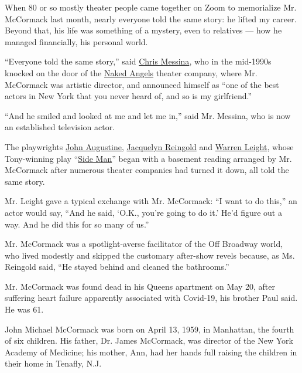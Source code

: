 When 80 or so mostly theater people came together on Zoom to memorialize
Mr. McCormack last month, nearly everyone told the same story: he lifted
my career. Beyond that, his life was something of a mystery, even to
relatives --- how he managed financially, his personal world.

``Everyone told the same story,'' said
\href{https://www.thecut.com/2020/02/why-chris-messina-should-be-on-the-chris-list.html}{Chris
Messina}, who in the mid-1990s knocked on the door of the
\href{https://www.nakedangels.com/}{Naked Angels} theater company, where
Mr. McCormack was artistic director, and announced himself as ``one of
the best actors in New York that you never heard of, and so is my
girlfriend.''

``And he smiled and looked at me and let me in,'' said Mr. Messina, who
is now an established television actor.

The playwrights
\href{https://www.broadwayworld.com/bwwbooks/article/Christopher-Durang-and-John-Augustine-Announced-as-Playwrights-in-Residence-at-Texas-State-20130904}{John
Augustine}, \href{https://www.jacquelynreingold.com/}{Jacquelyn
Reingold} and
\href{https://lawandorder.fandom.com/wiki/Warren_Leight}{Warren Leight},
whose Tony-winning play
``\href{https://www.nytimes.com/1998/11/09/theater/theater-review-a-new-drama-on-broadway-and-a-new-son-in-turmoil.html}{Side
Man}'' began with a basement reading arranged by Mr. McCormack after
numerous theater companies had turned it down, all told the same story.

Mr. Leight gave a typical exchange with Mr. McCormack: ``I want to do
this,'' an actor would say, ``And he said, `O.K., you're going to do
it.' He'd figure out a way. And he did this for so many of us.''

Mr. McCormack was a spotlight-averse facilitator of the Off Broadway
world, who lived modestly and skipped the customary after-show revels
because, as Ms. Reingold said, ``He stayed behind and cleaned the
bathrooms.''

Mr. McCormack was found dead in his Queens apartment on May 20, after
suffering heart failure apparently associated with Covid-19, his brother
Paul said. He was 61.

John Michael McCormack was born on April 13, 1959, in Manhattan, the
fourth of six children. His father, Dr. James McCormack, was director of
the New York Academy of Medicine; his mother, Ann, had her hands full
raising the children in their home in Tenafly, N.J.

